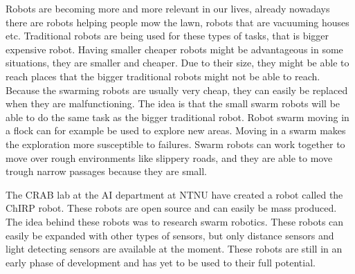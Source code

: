 Robots are becoming more and more relevant in our lives, already nowadays there are robots helping people mow the lawn, robots that are vacuuming houses etc. Traditional robots are being used for these types of tasks, that is bigger expensive robot. Having smaller cheaper robots might be advantageous in some situations, they are smaller and cheaper. Due to their size, they might be able to reach places that the bigger traditional robots might not be able to reach. Because the swarming robots are usually very cheap, they can easily be replaced when they are malfunctioning. The idea is that the small swarm robots will be able to do the same task as the bigger traditional robot. Robot swarm moving in a flock can for example be used to explore new areas. Moving in a swarm makes the exploration more susceptible to failures. Swarm robots can work together to move over rough environments like slippery roads, and they are able to move trough narrow passages because they are small.

The CRAB lab at the AI department at NTNU have created a robot called the ChIRP robot. These robots are open source and can easily be mass produced. The idea behind these robots was to research swarm robotics.
These robots can easily be expanded with other types of sensors, but only distance sensors and light detecting sensors are available at the moment. These robots are still in an early phase of development and has yet to be used to their full potential. 






